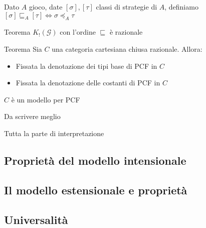 \documentclass{beamer}
\begin{document}
\begin{frame}
	
	Dato $A$ gioco, date $[\sigma],[\tau]$ classi di strategie di $A$, definiamo
	$[\sigma] \sqsubseteq_A [\tau] \Leftrightarrow \sigma \preccurlyeq_A \tau$
	
	\begin{block}{Teorema}
		$K_! (\mathcal{G})$ con l'ordine $\sqsubseteq$ è razionale
	\end{block}
	
	\begin{block}{Teorema}
		Sia $C$ una categoria cartesiana chiusa razionale. Allora:
		\begin{itemize}
			\item Fissata la denotazione dei tipi base di PCF in $C$
			\item Fissata la denotazione delle costanti di PCF in $C$
		\end{itemize}
		$C$ è un modello per PCF
		
		Da scrivere meglio

	\end{block}
	
\end{frame}


\begin{frame}
	
	Tutta la parte di interpretazione
	
\end{frame}



\subsection{Proprietà del modello intensionale}
\subsection{Il modello estensionale e proprietà}
\subsection{Universalità}
\end{document}

